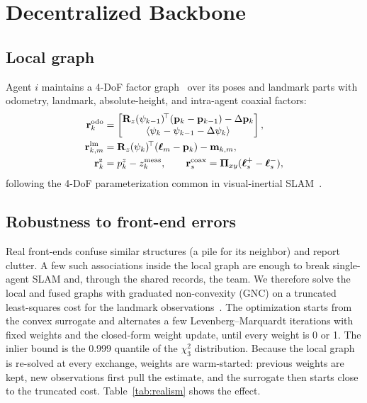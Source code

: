 \section{Decentralized Backbone}
\label{sec:system}

\subsection{Local graph}
Agent $i$ maintains a 4-DoF factor graph~\cite{dellaert2017factor} over its poses and landmark
parts with odometry, landmark, absolute-height, and intra-agent coaxial factors:
\begin{align}
  \mathbf{r}^{\mathrm{odo}}_{k} &= \begin{bmatrix} \mathbf{R}_z(\psi_{k-1})^{\!\top}(\mathbf{p}_k - \mathbf{p}_{k-1}) - \Delta\mathbf{p}_k \\
  \langle \psi_k - \psi_{k-1} - \Delta\psi_k \rangle \end{bmatrix}, \\
  \mathbf{r}^{\mathrm{lm}}_{k,m} &= \mathbf{R}_z(\psi_k)^{\!\top}(\boldsymbol{\ell}_m - \mathbf{p}_k) - \mathbf{m}_{k,m}, \\
  \mathbf{r}^{\mathrm{z}}_{k} &= p^z_k - z^{\mathrm{meas}}_k, \qquad
  \mathbf{r}^{\mathrm{coax}}_{s} = \boldsymbol{\Pi}_{xy}(\boldsymbol{\ell}^{+}_s - \boldsymbol{\ell}^{-}_s),
\end{align}
following the 4-DoF parameterization common in visual-inertial SLAM~\cite{qin2018vins}.

\subsection{Robustness to front-end errors}
Real front-ends confuse similar structures (a pile for its neighbor) and report
clutter. A few such associations inside the local graph are enough to break single-agent
SLAM and, through the shared records, the team. We therefore solve the local and fused graphs
with graduated non-convexity (GNC) on a truncated least-squares cost for the landmark
observations~\cite{yang2020gnc}. The optimization starts from the convex surrogate and
alternates a few Levenberg--Marquardt iterations with fixed weights and the closed-form
weight update, until every weight is 0 or 1. The inlier bound is the 0.999 quantile of the
$\chi^2_3$ distribution. Because the local graph is re-solved at every exchange, weights are
warm-started: previous weights are kept, new observations first pull the estimate, and the
surrogate then starts close to the truncated cost. Table~\ref{tab:realism} shows the effect.

